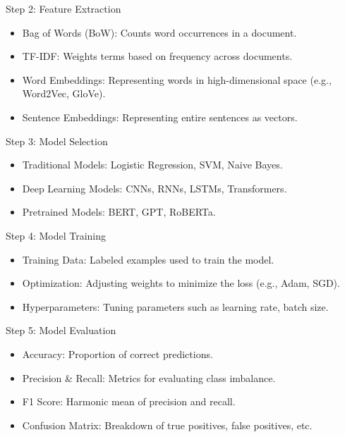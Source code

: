 \documentclass{beamer}
\begin{document}
\begin{frame}{Step 2: Feature Extraction}
    \begin{itemize}
        \item Bag of Words (BoW): Counts word occurrences in a document.
        \item TF-IDF: Weights terms based on frequency across documents.
        \item Word Embeddings: Representing words in high-dimensional space (e.g., Word2Vec, GloVe).
        \item Sentence Embeddings: Representing entire sentences as vectors.
    \end{itemize}
\end{frame}

\begin{frame}{Step 3: Model Selection}
    \begin{itemize}
        \item Traditional Models: Logistic Regression, SVM, Naive Bayes.
        \item Deep Learning Models: CNNs, RNNs, LSTMs, Transformers.
        \item Pretrained Models: BERT, GPT, RoBERTa.
    \end{itemize}
\end{frame}

\begin{frame}{Step 4: Model Training}
    \begin{itemize}
        \item Training Data: Labeled examples used to train the model.
        \item Optimization: Adjusting weights to minimize the loss (e.g., Adam, SGD).
        \item Hyperparameters: Tuning parameters such as learning rate, batch size.
    \end{itemize}
\end{frame}

\begin{frame}{Step 5: Model Evaluation}
    \begin{itemize}
        \item Accuracy: Proportion of correct predictions.
        \item Precision & Recall: Metrics for evaluating class imbalance.
        \item F1 Score: Harmonic mean of precision and recall.
        \item Confusion Matrix: Breakdown of true positives, false positives, etc.
    \end{itemize}
\end{frame}
\end{document}
